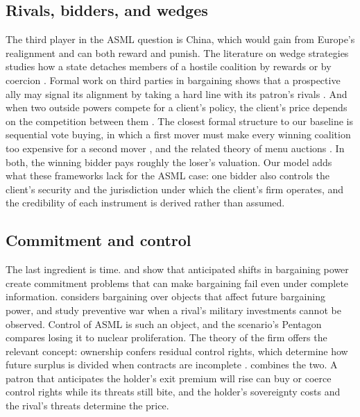 \subsection{Rivals, bidders, and wedges}

The third player in the ASML question is China, which would gain from Europe's realignment and can both reward and punish. The literature on wedge strategies studies how a state detaches members of a hostile coalition by rewards or by coercion \citep{crawford2011preventing, izumikawa2013coerce}. Formal work on third parties in bargaining shows that a prospective ally may signal its alignment by taking a hard line with its patron's rivals \citep{yoder2025fighting}. And when two outside powers compete for a client's policy, the client's price depends on the competition between them \citep{bueno2016competition}. The closest formal structure to our baseline is sequential vote buying, in which a first mover must make every winning coalition too expensive for a second mover \citep{groseclose1996buying}, and the related theory of menu auctions \citep{bernheim1986menu}. In both, the winning bidder pays roughly the loser's valuation. Our model adds what these frameworks lack for the ASML case: one bidder also controls the client's security and the jurisdiction under which the client's firm operates, and the credibility of each instrument is derived rather than assumed.

\subsection{Commitment and control}

The last ingredient is time. \citet{fearon1995rationalist} and \citet{powell2006war} show that anticipated shifts in bargaining power create commitment problems that can make bargaining fail even under complete information. \citet{fearon1996bargaining} considers bargaining over objects that affect future bargaining power, and \citet{debs2014known} study preventive war when a rival's military investments cannot be observed. Control of ASML is such an object, and the scenario's Pentagon compares losing it to nuclear proliferation. The theory of the firm offers the relevant concept: ownership confers residual control rights, which determine how future surplus is divided when contracts are incomplete \citep{grossman1986costs}.  combines the two. A patron that anticipates the holder's exit premium will rise can buy or coerce control rights while its threats still bite, and the holder's sovereignty costs and the rival's threats determine the price.

